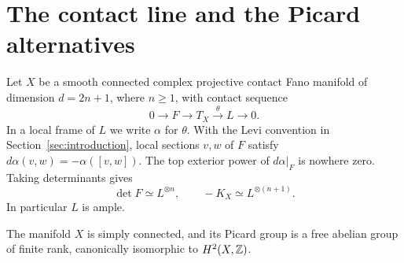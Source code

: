 \section{The contact line and the Picard alternatives}
\label{red:section}

Let $X$ be a smooth connected complex projective contact Fano manifold
of dimension $d=2n+1$, where $n\geq1$, with contact sequence
\begin{equation}\label{red:contact}
0\longrightarrow F\longrightarrow T_X
\xrightarrow{\theta}L\longrightarrow0.
\end{equation}
In a local frame of $L$ we write $\alpha$ for $\theta$. With the Levi
convention in Section~\ref{sec:introduction}, local sections $v,w$ of
$F$ satisfy $d\alpha(v,w)=-\alpha([v,w])$.
The top exterior power of $d\alpha|_F$ is nowhere zero. Taking determinants gives
\begin{equation}\label{red:determinant}
\det F\simeq L^{\otimes n},\qquad
-K_X\simeq L^{\otimes(n+1)}.
\end{equation}
In particular $L$ is ample.

\begin{lemma}\label{red:simply-connected}
The manifold $X$ is simply connected, and its Picard group is a free
abelian group of finite rank, canonically isomorphic to $H^2(X,\mathbb Z)$.
\end{lemma}

